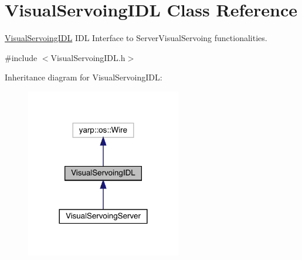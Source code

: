 \hypertarget{classVisualServoingIDL}{}\section{Visual\+Servoing\+I\+DL Class Reference}
\label{classVisualServoingIDL}


\hyperlink{classVisualServoingIDL}{Visual\+Servoing\+I\+DL} I\+DL Interface to Server\+Visual\+Servoing functionalities.  




{\ttfamily \#include $<$Visual\+Servoing\+I\+D\+L.\+h$>$}



Inheritance diagram for Visual\+Servoing\+I\+DL\+:
\nopagebreak
\begin{figure}[H]
\begin{center}
\leavevmode
\includegraphics[width=192pt]{classVisualServoingIDL__inherit__graph}
\end{center}
\end{figure}
